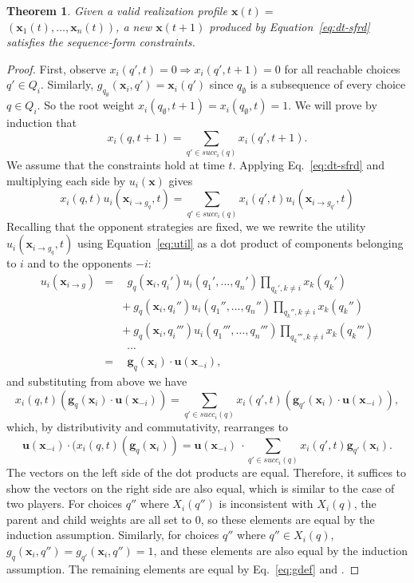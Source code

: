 \documentclass{aamas2014}
\newcommand{\bx}{\mathbf{x}}
\newcommand{\bg}{\mathbf{g}}
\newcommand{\bu}{\mathbf{u}}
\newtheorem{theorem}{Theorem}
\begin{document}
\begin{theorem}
Given a valid realization profile $\bx(t) = $\\ $(\bx_1(t), \ldots, \bx_n(t))$, a new $\bx(t+1)$ produced by
Equation~\ref{eq:dt-sfrd} satisfies the sequence-form constraints. 
\end{theorem}
\begin{proof}
First, observe $x_i(q',t) = 0 \Rightarrow x_i(q',t+1) = 0$ for all reachable choices $q' \in Q_i$. 
Similarly,  $g_{q_{\emptyset}}(\bx_i, q') = \bx_i(q')$ since $q_{\emptyset}$ is a subsequence of every choice 
$q \in Q_i$. So the root weight $x_i(q_{\emptyset}, t+1) = x_i(q_{\emptyset},t) = 1$.   
We will prove by induction that 
\[ x_i(q,t+1) = \sum_{q' \in succ_i(q)} x_i(q',t+1). \]
We assume that the constraints hold at time $t$. 
Applying Eq.~\ref{eq:dt-sfrd} and multiplying each side by $u_i(\bx)$ gives
\[
x_i(q,t) u_i(\bx_{i \rightarrow g_q}, t) = \sum_{q' \in succ_i(q)} x_i(q',t) u_i(\bx_{i \rightarrow g_{q'}},t) 
\]
Recalling that the opponent strategies are fixed, we 
we rewrite the utility $u_i(\bx_{i \rightarrow g_q}, t)$ using Equation~\ref{eq:util} as a dot product of 
components belonging to $i$ and to the opponents $-i$: 
\begin{eqnarray*}
u_i(\bx_{i \rightarrow g}) & = & ~~g_q(\bx_i, q_i') u_i(q_1', \ldots, q_n') \prod_{q_k', k \not= i} x_k(q_k') \\
                           &   & +~g_q(\bx_i, q_i'') u_i(q_1'', \ldots, q_n'') \prod_{q_k'', k \not= i} x_k(q_k'') \\
                           &   & +~g_q(\bx_i, q_i''') u_i(q_1''', \ldots, q_n''') \prod_{q_k''', k \not= i} x_k(q_k''') \\
                           &   & ~~\cdots \\
                           & = & ~~\bg_q(\bx_i) \cdot \bu(\bx_{-i}),
\end{eqnarray*}
and substituting from above we have 
\[x_i(q,t)(\bg_q(\bx_i) \cdot \bu(\bx_{-i})) = \sum_{q' \in succ_i(q)} x_i(q',t) (\bg_{q'}(\bx_i) \cdot \bu(\bx_{-i})), \]
which, by distributivity and commutativity, rearranges to
\[ \bu(\bx_{-i}) \cdot (x_i(q,t)(\bg_q(\bx_i)) = \bu(\bx_{-i})~\cdot\sum_{q' \in succ_i(q)} x_i(q',t) \bg_{q'}(\bx_i). \]
The vectors on the left side of the dot products are equal.
Therefore, it suffices to show the vectors on the right side are also equal, which is similar to the case of two players.   
For choices $q''$ where $X_i(q'')$ is inconsistent with $X_i(q)$, the parent and child weights are all set to $0$, so these 
elements are equal by the induction assumption. 
Similarly, for choices $q''$ where $q'' \in X_i(q)$, $g_q(\bx_i, q'') = g_{q'}(\bx_i, q'') = 1$, and these elements are also 
equal by the induction assumption. 
The remaining elements are equal by Eq.~\ref{eq:gdef} and \cite[Lemma 6]{Gatti13Efficient}. 
\end{proof}
\end{document}
